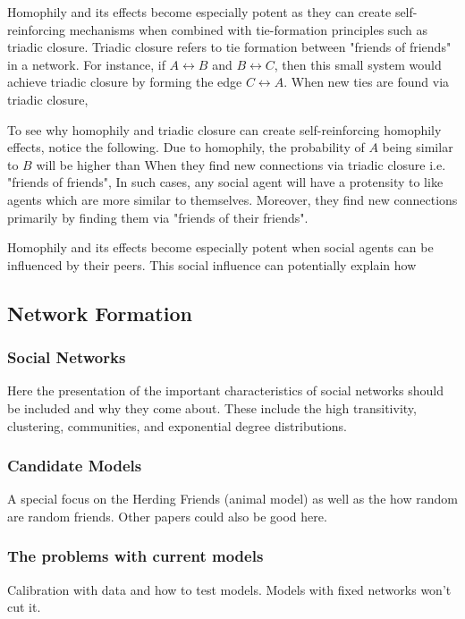 \documentclass[9pt,twocolumn,twoside]{ilcss}
\begin{document}
Homophily and its effects become especially potent as they can create self-reinforcing mechanisms when combined with tie-formation principles such as triadic closure. 
Triadic closure refers to tie formation between "friends of friends" in a network. For instance, if $A \leftrightarrow B$ and $B \leftrightarrow C$, then this small system would achieve triadic closure by forming the edge $C \leftrightarrow A$. 
When new ties are found via triadic closure, 

To see why homophily and triadic closure can create self-reinforcing homophily effects, notice the following. Due to homophily, the probability of $A$ being similar to $B$ will be higher than
When they find new connections via triadic closure i.e. "friends of friends", 
In such cases, any social agent will have a protensity to like agents which are more similar to themselves. Moreover, they find new connections primarily by finding them via "friends of their friends". 

Homophily and its effects become especially potent when social agents can be influenced by their peers. 
This social influence can potentially explain how 

\subsection{Network Formation}

\subsubsection{Social Networks}
Here the presentation of the important characteristics of social networks should be included and why they come about. 
These include the high transitivity, clustering, communities, and exponential degree distributions.

\subsubsection{Candidate Models}

A special focus on the Herding Friends (animal model) as well as the how random are random friends. Other papers could also be good here.

\subsubsection{The problems with current models}

Calibration with data and how to test models. Models with fixed networks won't cut it. 
\end{document}

